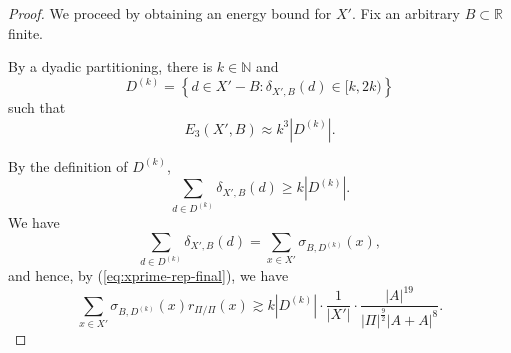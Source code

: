 \documentclass[reqno]{amsart}
\numberwithin{equation}{section}
\begin{document}
\begin{proof}
We proceed by obtaining an energy bound for \(X'\).
Fix an arbitrary \(B \subset \mathbb{R} \) finite.

By a dyadic partitioning, there is \(k \in \mathbb{N} \) and
\[
    D^{(k)} = \left\{ d \in X'  - B  : \delta_{X',B} (d) \in [k,2k) \right\}
\]
such that
\[
    E_{3} (X',B)\approx k ^{3} \left\lvert D^{(k)} \right\rvert 
.\]

By the definition of \(D^{(k)}\),
\[
    \sum _{d \in D^{(k)}} \delta_{X',B} (d) \geq k \left\lvert D^{(k)} \right\rvert 
.\]
We have
\[
    \sum _{d \in D^{(k)}} \delta_{X',B} (d) = \sum _{x \in X'} \sigma_{B,D^{(k)}} (x)
,\]
and hence, by (\ref{eq:xprime-rep-final}), we have
\begin{equation} \label{eq:lem-lower-bound}
    \sum _{x \in X'} \sigma_{B,D^{(k)}} (x) r_{ \Pi / \Pi} (x) \gtrsim k \left\lvert D^{(k)} \right\rvert \cdot \frac{1}{\left\lvert X' \right\rvert } \cdot \frac{\left\lvert A \right\rvert ^{19}}{\left\lvert \Pi \right\rvert ^{\frac{9}{2} } \left\lvert A + A \right\rvert ^{8}}  .
\end{equation}  


\end{proof}
\end{document}
